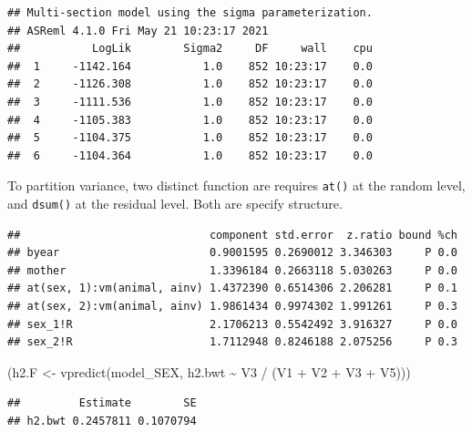 \documentclass[
  12pt,
]{book}
\newenvironment{Shaded}{\begin{snugshade}}{\end{snugshade}}
\newcommand{\FunctionTok}[1]{\textcolor[rgb]{0.00,0.00,0.00}{#1}}
\newcommand{\NormalTok}[1]{#1}
\newcommand{\OtherTok}[1]{\textcolor[rgb]{0.56,0.35,0.01}{#1}}
\newcommand{\SpecialCharTok}[1]{\textcolor[rgb]{0.00,0.00,0.00}{#1}}
\begin{document}
\begin{verbatim}
## Multi-section model using the sigma parameterization.
## ASReml 4.1.0 Fri May 21 10:23:17 2021
##           LogLik        Sigma2     DF     wall    cpu
##  1     -1142.164           1.0    852 10:23:17    0.0
##  2     -1126.308           1.0    852 10:23:17    0.0
##  3     -1111.536           1.0    852 10:23:17    0.0
##  4     -1105.383           1.0    852 10:23:17    0.0
##  5     -1104.375           1.0    852 10:23:17    0.0
##  6     -1104.364           1.0    852 10:23:17    0.0
\end{verbatim}

To partition variance, two distinct function are requires \texttt{at()} at the random level, and \texttt{dsum()} at the residual level. Both are specify structure.

\begin{Shaded}
\end{Shaded}

\begin{verbatim}
##                             component std.error  z.ratio bound %ch
## byear                       0.9001595 0.2690012 3.346303     P 0.0
## mother                      1.3396184 0.2663118 5.030263     P 0.0
## at(sex, 1):vm(animal, ainv) 1.4372390 0.6514306 2.206281     P 0.1
## at(sex, 2):vm(animal, ainv) 1.9861434 0.9974302 1.991261     P 0.3
## sex_1!R                     2.1706213 0.5542492 3.916327     P 0.0
## sex_2!R                     1.7112948 0.8246188 2.075256     P 0.3
\end{verbatim}

\begin{Shaded}
\begin{Highlighting}[]
\NormalTok{(h2.F }\OtherTok{\textless{}{-}} \FunctionTok{vpredict}\NormalTok{(model\_SEX, h2.bwt }\SpecialCharTok{\textasciitilde{}}\NormalTok{ V3 }\SpecialCharTok{/}\NormalTok{ (V1 }\SpecialCharTok{+}\NormalTok{ V2 }\SpecialCharTok{+}\NormalTok{ V3 }\SpecialCharTok{+}\NormalTok{ V5)))}
\end{Highlighting}
\end{Shaded}

\begin{verbatim}
##         Estimate        SE
## h2.bwt 0.2457811 0.1070794
\end{verbatim}
\end{document}
